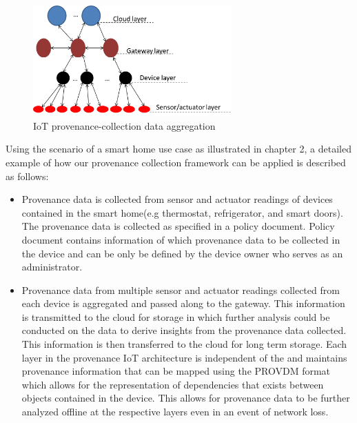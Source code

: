 \begin{figure}[h!]
\begin{center}

\includegraphics[width=3.0in]{iot_aggregation.PNG}    
\end{center}
\caption{IoT provenance-collection data aggregation}
\label{aggregation}
\end{figure}


Using the scenario of a smart home use case as illustrated in chapter 2, a detailed example of how our provenance collection framework can be applied is described as follows:

\begin{itemize}

\item Provenance data is collected from sensor and actuator readings of devices contained in the smart home(e.g thermostat, refrigerator, and smart doors). The provenance data is collected as specified in a policy document. Policy document contains information of which provenance data to be collected in the device and can be only be defined by the device owner who serves as an administrator. 

\item Provenance data from multiple sensor and actuator readings collected from each device is aggregated and passed along to the gateway. This information is transmitted to the cloud for storage in which further analysis could be conducted on the data to derive insights from the provenance data collected. This information is then transferred to the cloud for long term storage. Each layer in the provenance IoT architecture is independent of the and maintains provenance information that can be mapped using the PROV\-DM format which allows for the representation of dependencies that exists between objects contained in the device. This allows for provenance data to be further analyzed offline at the respective layers even in an event of network loss. 

\end{itemize}





